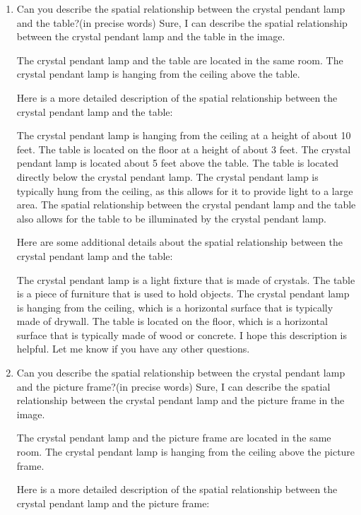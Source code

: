 \begin{enumerate}
    \item Can you describe the spatial relationship between the crystal pendant lamp and the table?(in precise words)
    \subitem 
    Sure, I can describe the spatial relationship between the crystal pendant lamp and the table in the image.
    
    The crystal pendant lamp and the table are located in the same room. The crystal pendant lamp is hanging from the ceiling above the table.
    
    Here is a more detailed description of the spatial relationship between the crystal pendant lamp and the table:
    
    The crystal pendant lamp is hanging from the ceiling at a height of about 10 feet.
    The table is located on the floor at a height of about 3 feet.
    The crystal pendant lamp is located about 5 feet above the table.
    The table is located directly below the crystal pendant lamp.
    The crystal pendant lamp is typically hung from the ceiling, as this allows for it to provide light to a large area. The spatial relationship between the crystal pendant lamp and the table also allows for the table to be illuminated by the crystal pendant lamp.
    
    Here are some additional details about the spatial relationship between the crystal pendant lamp and the table:
    
    The crystal pendant lamp is a light fixture that is made of crystals.
    The table is a piece of furniture that is used to hold objects.
    The crystal pendant lamp is hanging from the ceiling, which is a horizontal surface that is typically made of drywall.
    The table is located on the floor, which is a horizontal surface that is typically made of wood or concrete.
    I hope this description is helpful. Let me know if you have any other questions.
    \item Can you describe the spatial relationship between the crystal pendant lamp and the picture frame?(in precise words)
    \subitem 
    Sure, I can describe the spatial relationship between the crystal pendant lamp and the picture frame in the image.
    
    The crystal pendant lamp and the picture frame are located in the same room. The crystal pendant lamp is hanging from the ceiling above the picture frame.
    
    Here is a more detailed description of the spatial relationship between the crystal pendant lamp and the picture frame:
    

\end{enumerate}
